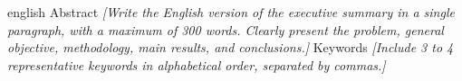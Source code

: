 \UTIResumenPagina
  {english}
  {Abstract}
  {\textit{[Write the English version of the executive summary in a single paragraph, with a maximum of 300 words. Clearly present the problem, general objective, methodology, main results, and conclusions.]}}
  {Keywords}
  {\textit{[Include 3 to 4 representative keywords in alphabetical order, separated by commas.]}}
